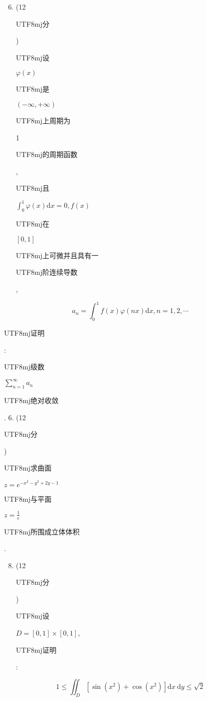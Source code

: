 \documentclass[10pt]{article}
\begin{document}
\begin{enumerate}
  \setcounter{enumi}{5}
  \item (12 \begin{CJK}{UTF8}{mj}分\end{CJK}) \begin{CJK}{UTF8}{mj}设\end{CJK} $\varphi(x)$ \begin{CJK}{UTF8}{mj}是\end{CJK} $(-\infty,+\infty)$ \begin{CJK}{UTF8}{mj}上周期为\end{CJK} 1 \begin{CJK}{UTF8}{mj}的周期函数\end{CJK}, \begin{CJK}{UTF8}{mj}且\end{CJK} $\int_{0}^{1} \varphi(x) \mathrm{d} x=0, f(x)$ \begin{CJK}{UTF8}{mj}在\end{CJK} $[0,1]$ \begin{CJK}{UTF8}{mj}上可微并且具有一\end{CJK} \begin{CJK}{UTF8}{mj}阶连续导数\end{CJK},
\end{enumerate}
$$
a_{n}=\int_{0}^{1} f(x) \varphi(n x) \mathrm{d} x, n=1,2, \cdots
$$
\begin{CJK}{UTF8}{mj}证明\end{CJK}: \begin{CJK}{UTF8}{mj}级数\end{CJK} $\sum_{n=1}^{\infty} a_{n}$ \begin{CJK}{UTF8}{mj}绝对收敛\end{CJK}. 6. (12 \begin{CJK}{UTF8}{mj}分\end{CJK}) \begin{CJK}{UTF8}{mj}求曲面\end{CJK} $z=e^{-x^{2}-y^{2}+2 y-1}$ \begin{CJK}{UTF8}{mj}与平面\end{CJK} $z=\frac{1}{e}$ \begin{CJK}{UTF8}{mj}所围成立体体积\end{CJK}.

\begin{enumerate}
  \setcounter{enumi}{7}
  \item (12 \begin{CJK}{UTF8}{mj}分\end{CJK}) \begin{CJK}{UTF8}{mj}设\end{CJK} $D=[0,1] \times[0,1]$, \begin{CJK}{UTF8}{mj}证明\end{CJK}:
\end{enumerate}
$$
1 \leqslant \iint_{D}\left[\sin \left(x^{2}\right)+\cos \left(x^{2}\right)\right] \mathrm{d} x \mathrm{~d} y \leqslant \sqrt{2}
$$
\end{document}
